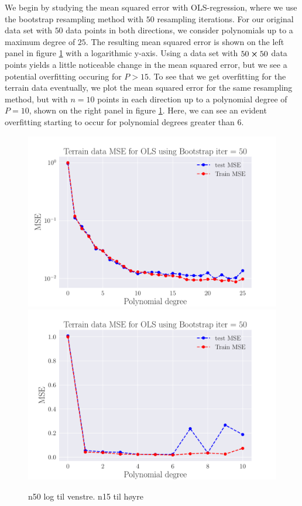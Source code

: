 \documentclass[reprint,english,notitlepage,aps,nobalancelastpage,nofootinbib]{revtex4-1}  %
\begin{document}
We begin by studying the mean squared error with OLS-regression, where we use the bootstrap resampling method with $50$ resampling iterations. For our original data set with $50$ data points in both directions, we consider polynomials up to a maximum degree of $25$. The resulting mean squared error is shown on the left panel in figure \ref{fig:terrain_OLS_MSE_bootstrap} with a logarithmic y-axis. Using a data set with $50\cross50$ data points yields a little noticeable change in the mean squared error, but we see a potential overfitting occuring for $P>15$. To see that we get overfitting for the terrain data eventually, we plot the mean squared error for the same resampling method, but with $n=10$ points in each direction up to a polynomial degree of $P=10$, shown on the right panel in figure \ref{fig:terrain_OLS_MSE_bootstrap}. Here, we can see an evident overfitting starting to occur for polynomial degrees greater than $6$.

\begin{figure}[H]
  \includegraphics[width=\linewidth]{SRTM_MSE_OLS_n50_pol25_Bootstrap_re50_log.pdf}
  \endminipage\hfill
  \includegraphics[width=\linewidth]{SRTM_MSE_OLS_n15_pol10_Bootstrap_re50.pdf}
  \endminipage
  \caption{n50 log til venstre. n15 til høyre}
  \label{fig:terrain_OLS_MSE_bootstrap}
\end{figure}
\end{document}
